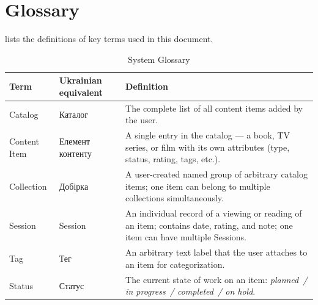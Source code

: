 \section{Glossary}
\label{sec:hlosarii}

 lists the definitions of key terms used in this document.

\begin{table}[h]
\caption{System Glossary}
\label{tab:hlosarii}
\begin{tabular}{L{3.5cm} L{3.5cm} L{7cm}}
\toprule
\textbf{Term} & \textbf{Ukrainian equivalent} & \textbf{Definition} \\
\midrule
Catalog & Каталог & The complete list of all content items added by the user.  \\
\addlinespace
Content Item & Елемент контенту & A single entry in the catalog --- a book, TV series, or film with its own attributes (type, status, rating, tags, etc.).  \\
\addlinespace
Collection & Добірка & A user-created named group of arbitrary catalog items; one item can belong to multiple collections simultaneously.  \\
\addlinespace
Session & Session & An individual record of a viewing or reading of an item; contains date, rating, and note; one item can have multiple Sessions.  \\
\addlinespace
Tag & Тег & An arbitrary text label that the user attaches to an item for categorization.  \\
\addlinespace
Status & Статус & The current state of work on an item: \emph{planned~/ in progress~/ completed~/ on hold}.  \\
\bottomrule
\end{tabular}
\end{table}
